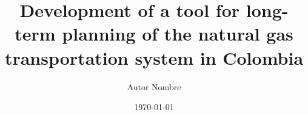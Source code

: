 \documentclass[aspectratio=169,12pt]{MyTheme}
\title{Development of a tool for long-term planning of the natural gas transportation system in Colombia}
\author{Autor Nombre}
\institute{Instituto XYZ}
\date{\today}
\begin{document}
	
	\begin{frame}[plain]
		\titlepage
	\end{frame}
	
\end{document}
